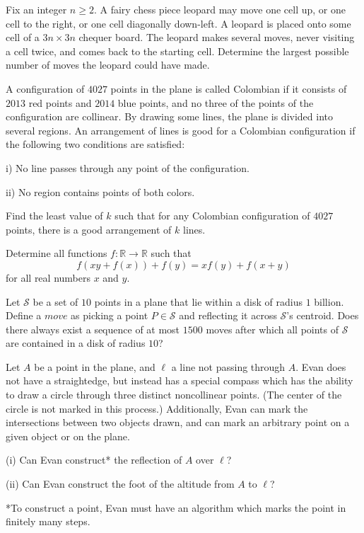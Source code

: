 \documentclass[11pt]{scrartcl}
\begin{document}
\begin{problem}[5726273084626389998]
	Fix an integer $n \ge 2$. A fairy chess piece leopard may move one cell up, or one cell to the right, or one cell diagonally down-left. A leopard is placed onto some cell of a $3n \times 3n$ chequer board. The leopard makes several moves, never visiting a cell twice, and comes back to the starting cell. Determine the largest possible number of moves the leopard could have made.
\end{problem}
\begin{problem}[155530102293601]
A configuration of $4027$ points in the plane is called Colombian if it consists of $2013$ red points and $2014$ blue points, and no three of the points of the configuration are collinear. By drawing some lines, the plane is divided into several regions. An arrangement of lines is good for a Colombian configuration if the following two conditions are satisfied:

i) No line passes through any point of the configuration.

ii) No region contains points of both colors.

Find the least value of $k$ such that for any Colombian configuration of $4027$ points, there is a good arrangement of $k$ lines.
\end{problem}
\begin{problem}[8540244741312291150]
Determine all functions $f:\mathbb{R} \to \mathbb{R}$ such that
\[ f(xy+f(x)) + f(y) = xf(y) + f(x+y) \]for all real numbers $x$ and $y$.
\end{problem}
\begin{problem}[2649132917657979429]
Let $\mathcal{S}$ be a set of $10$ points in a plane that lie within a disk of radius $1$ billion. Define a $move$ as picking a point $P \in \mathcal{S}$ and reflecting it across $\mathcal{S}$'s centroid. Does there always exist a sequence of at most $1500$ moves after which all points of $\mathcal{S}$ are contained in a disk of radius $10$?
\end{problem}
\begin{problem}[70043882336455]
Let $A$ be a point in the plane, and $\ell$ a line not passing through $A$. Evan does not have a straightedge, but instead has a special compass which has the ability to draw a circle through three distinct noncollinear points. (The center of the circle is not marked in this process.) Additionally, Evan can mark the intersections between two objects drawn, and can mark an arbitrary point on a given object or on the plane.

(i) Can Evan construct* the reflection of $A$ over $\ell$?

(ii) Can Evan construct the foot of the altitude from $A$ to $\ell$?

*To construct a point, Evan must have an algorithm which marks the point in finitely many steps.
\end{problem}
\end{document}
